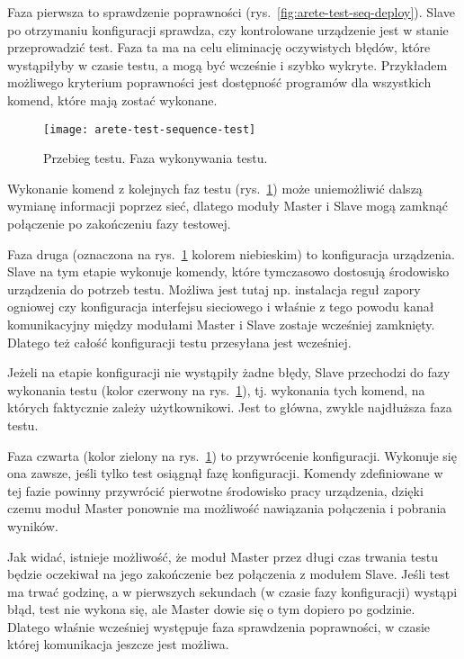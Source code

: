 \documentclass[00-praca-magisterska.tex]{subfiles}
\begin{document}
Faza pierwsza to sprawdzenie poprawności (rys.~\ref{fig:arete-test-seq-deploy}).
Slave po otrzymaniu konfiguracji sprawdza, czy kontrolowane urządzenie jest w
stanie przeprowadzić test. Faza ta ma na celu eliminację oczywistych błędów,
które wystąpiłyby w czasie testu, a mogą być wcześnie i szybko wykryte.
Przykładem możliwego kryterium poprawności jest dostępność programów dla
wszystkich komend, które mają zostać wykonane.

\begin{figure}
\begin{center}
\leavevmode
\texttt{[image: arete-test-sequence-test]}
\end{center}
\caption{Przebieg testu. Faza wykonywania testu.}
\label{fig:arete-test-seq-test}
\end{figure}

Wykonanie komend z kolejnych faz testu (rys.~\ref{fig:arete-test-seq-test})
może uniemożliwić dalszą wymianę informacji poprzez sieć, dlatego moduły Master
i Slave mogą zamknąć połączenie po zakończeniu fazy testowej.

Faza druga (oznaczona na rys.~\ref{fig:arete-test-seq-test} kolorem niebieskim)
to konfiguracja urządzenia. Slave na tym etapie wykonuje komendy, które
tymczasowo dostosują środowisko urządzenia do potrzeb testu. Możliwa jest tutaj
np. instalacja reguł zapory ogniowej czy konfiguracja interfejsu sieciowego i
właśnie z tego powodu kanał komunikacyjny między modułami Master i Slave
zostaje wcześniej zamknięty. Dlatego też całość konfiguracji testu przesyłana
jest wcześniej.

Jeżeli na etapie konfiguracji nie wystąpiły żadne błędy, Slave przechodzi do
fazy wykonania testu (kolor czerwony na rys.~\ref{fig:arete-test-seq-test}), tj.
wykonania tych komend, na których faktycznie zależy użytkownikowi. Jest to
główna, zwykle najdłuższa faza testu.

Faza czwarta (kolor zielony na rys.~\ref{fig:arete-test-seq-test}) to
przywrócenie konfiguracji. Wykonuje się ona zawsze, jeśli tylko test osiągnął
fazę konfiguracji. Komendy zdefiniowane w tej fazie powinny przywrócić
pierwotne środowisko pracy urządzenia, dzięki czemu moduł Master ponownie ma
możliwość nawiązania połączenia i pobrania wyników.

Jak widać, istnieje możliwość, że moduł Master przez długi czas trwania testu
będzie oczekiwał na jego zakończenie bez połączenia z modułem Slave. Jeśli test
ma trwać godzinę, a w pierwszych sekundach (w czasie fazy konfiguracji) wystąpi
błąd, test nie wykona się, ale Master dowie się o tym dopiero po godzinie.
Dlatego właśnie wcześniej występuje faza sprawdzenia poprawności, w czasie
której komunikacja jeszcze jest możliwa.
\end{document}
